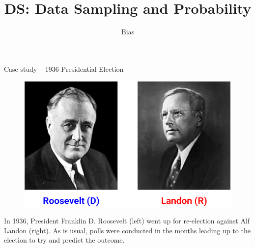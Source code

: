 \documentclass[aspectratio=169]{../latex_main/tntbeamer}  %
\title[Bias]{DS: Data Sampling and Probability}
\subtitle{Bias}
\begin{document}
	
	\maketitle
	\begin{frame}{Case study – 1936 Presidential Election}
	  \begin{figure}
	      \centering
	      \includegraphics[scale=.4]{Bild11}
	  \end{figure}
	  In 1936, President Franklin D. Roosevelt (left) went up for re-election against Alf Landon (right). As is usual, polls were conducted in the months leading up to the election to try and predict the outcome.

	\end{frame}
	
\end{document}
